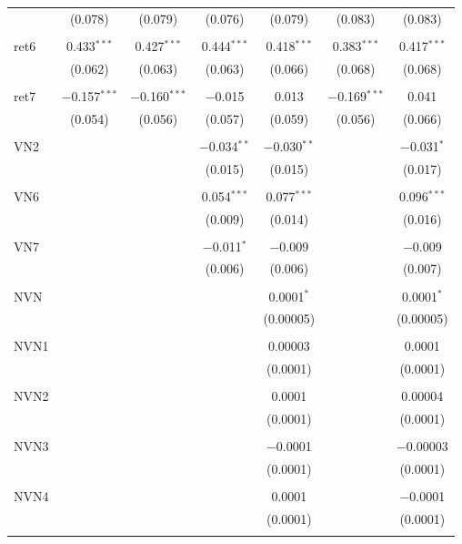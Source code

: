 \begin{table}[!htbp]
\begin{tabular}{@{\extracolsep{5pt}}lcccccc}
  & (0.078) & (0.079) & (0.076) & (0.079) & (0.083) & (0.083) \\ 
  & & & & & & \\ 
 ret6 & 0.433$^{***}$ & 0.427$^{***}$ & 0.444$^{***}$ & 0.418$^{***}$ & 0.383$^{***}$ & 0.417$^{***}$ \\ 
  & (0.062) & (0.063) & (0.063) & (0.066) & (0.068) & (0.068) \\ 
  & & & & & & \\ 
 ret7 & $-$0.157$^{***}$ & $-$0.160$^{***}$ & $-$0.015 & 0.013 & $-$0.169$^{***}$ & 0.041 \\ 
  & (0.054) & (0.056) & (0.057) & (0.059) & (0.056) & (0.066) \\ 
  & & & & & & \\ 
 VN2 &  &  & $-$0.034$^{**}$ & $-$0.030$^{**}$ &  & $-$0.031$^{*}$ \\ 
  &  &  & (0.015) & (0.015) &  & (0.017) \\ 
  & & & & & & \\ 
 VN6 &  &  & 0.054$^{***}$ & 0.077$^{***}$ &  & 0.096$^{***}$ \\ 
  &  &  & (0.009) & (0.014) &  & (0.016) \\ 
  & & & & & & \\ 
 VN7 &  &  & $-$0.011$^{*}$ & $-$0.009 &  & $-$0.009 \\ 
  &  &  & (0.006) & (0.006) &  & (0.007) \\ 
  & & & & & & \\ 
 NVN &  &  &  & 0.0001$^{*}$ &  & 0.0001$^{*}$ \\ 
  &  &  &  & (0.00005) &  & (0.00005) \\ 
  & & & & & & \\ 
 NVN1 &  &  &  & 0.00003 &  & 0.0001 \\ 
  &  &  &  & (0.0001) &  & (0.0001) \\ 
  & & & & & & \\ 
 NVN2 &  &  &  & 0.0001 &  & 0.00004 \\ 
  &  &  &  & (0.0001) &  & (0.0001) \\ 
  & & & & & & \\ 
 NVN3 &  &  &  & $-$0.0001 &  & $-$0.00003 \\ 
  &  &  &  & (0.0001) &  & (0.0001) \\ 
  & & & & & & \\ 
 NVN4 &  &  &  & 0.0001 &  & $-$0.0001 \\ 
  &  &  &  & (0.0001) &  & (0.0001) \\ 
  & & & & & & \\ 

\end{tabular}
\end{table}
